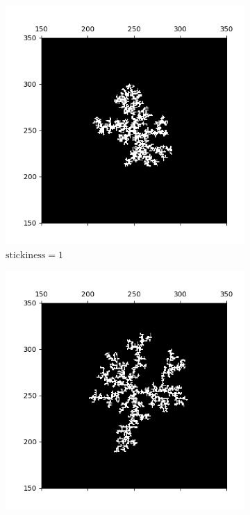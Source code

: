 \documentclass[aps,preprint,groupedaddress,letterpaper]{revtex4-1}
\begin{document}
\begin{figure}[h]
     \centering
     \begin{subfigure}[h]{0.23\textwidth}
         \centering
         \includegraphics[width=\textwidth]{img/stickiness/st0.1.png}
         \caption{$\text{stickiness} = 1$}
         \label{st1}
     \end{subfigure}
     \hfill
     \begin{subfigure}[h]{0.23\textwidth}
         \centering
         \includegraphics[width=\textwidth]{img/stickiness/st0.25.png}

\end{subfigure}
\end{figure}
\end{document}
